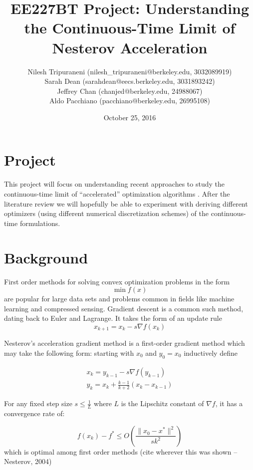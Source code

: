 \documentclass{article}
\title{EE227BT Project:
Understanding the Continuous-Time Limit of Nesterov Acceleration}
\author{Nilesh Tripuraneni (nilesh\_tripuraneni@berkeley.edu, 3032089919)\\ Sarah Dean (sarahdean@eecs.berkeley.edu, 3031893242)\\ Jeffrey Chan (chanjed@berkeley.edu, 24988067)\\ Aldo Pacchiano (pacchiano@berkeley.edu, 26995108)}
\date{October 25, 2016}
\begin{document}
\maketitle


\section{Project}

This project will focus on understanding recent approaches to study the continuous-time limit of ``accelerated'' optimization algorithms \cite{su2014differential, wibisono2016variational, krichene2015accelerated}. After
the literature review we will hopefully be able to experiment with deriving different optimizers (using different numerical discretization schemes) of the continuous-time formulations.

\section{Background}
First order methods for solving convex optimization problems in the form
\[\min f(x)\]
are popular for large data sets and problems common in fields like machine learning and compressed sensing. Gradient descent is a common such method, dating back to Euler and Lagrange. It takes the form of an update rule
\[x_{k+1} = x_k - s \nabla f(x_k)\]


Nesterov's acceleration gradient method is a first-order gradient method which may take the following form: starting with $x_0$ and $y_0 = x_0$ inductively define

\begin{align}
    x_k = y_{k-1} - s \nabla f(y_{k-1})\\
    y_k = x_k + \frac{k-1}{k+2} (x_k - x_{k-1})
\end{align}

For any fixed step size $s \leq \frac{1}{L}$ where $L$ is the Lipschitz constant of $\nabla f$, it has a convergence rate of:
 
\begin{equation}
f(x_k) - f^* \leq O \left(\frac{\|x_0 - x^*\|^2}{sk^2} \right)
\end{equation}
which is optimal among first order methods (cite wherever this was shown -- Nesterov, 2004)





\end{document}
